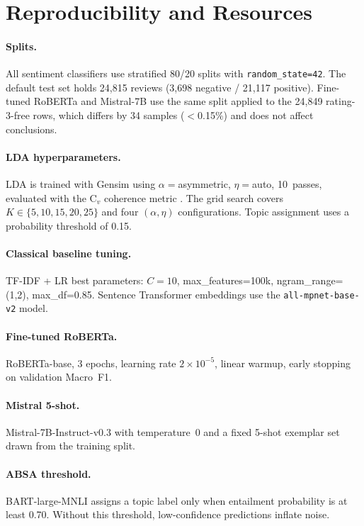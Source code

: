 \documentclass[11pt]{article}
\begin{document}
\section{Reproducibility and Resources}
\label{app:repro}

\paragraph{Splits.}
All sentiment classifiers use stratified 80/20 splits with
\texttt{random\_state=42}.
The default test set holds 24{,}815 reviews
(3{,}698 negative / 21{,}117 positive).
Fine-tuned RoBERTa and Mistral-7B use the same split applied to the
24{,}849 rating-3-free rows, which differs by 34 samples
($<$0.15\%) and does not affect conclusions.

\paragraph{LDA hyperparameters.}
LDA is trained with Gensim using $\alpha{=}$asymmetric,
$\eta{=}$auto, 10~passes, evaluated with the C$_v$ coherence metric
\cite{roder2015coherence}.
The grid search covers
$K \in \{5, 10, 15, 20, 25\}$ and four $(\alpha, \eta)$
configurations.
Topic assignment uses a probability threshold of 0.15.

\paragraph{Classical baseline tuning.}
TF-IDF + LR best parameters: $C{=}10$, max\_features=100k,
ngram\_range=(1,2), max\_df=0.85.
Sentence Transformer embeddings use the
\texttt{all-mpnet-base-v2} model.

\paragraph{Fine-tuned RoBERTa.}
RoBERTa-base, 3 epochs, learning rate $2{\times}10^{-5}$, linear
warmup, early stopping on validation Macro~F1.

\paragraph{Mistral 5-shot.}
Mistral-7B-Instruct-v0.3 with temperature~0 and a fixed 5-shot
exemplar set drawn from the training split.

\paragraph{ABSA threshold.}
BART-large-MNLI assigns a topic label only when entailment
probability is at least 0.70.
Without this threshold, low-confidence predictions inflate noise.
\end{document}
